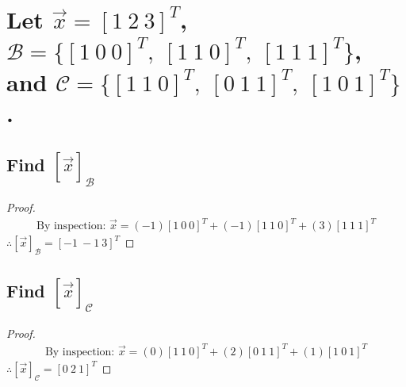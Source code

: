 \documentclass[../main.tex]{subfiles}
\begin{document}
\section{Let $\vec{x} = [1 \ 2 \ 3]^T$, $\mathcal{B} = \{[1 \ 0 \ 0]^T, \  [1 \ 1 \ 0]^T, \ [1 \ 1 \ 1]^T \}$, and $\mathcal{C} = \{[1 \ 1 \ 0]^T, \  [0 \ 1 \ 1]^T, \ [1 \ 0 \ 1]^T \}$.}
\subsection{Find $[\vec{x}]_{\mathcal{B}}$}
        \begin{proof}
                \begin{align*}
                        \textrm{By inspection: }  \vec{x} = (-1)[1 \ 0 \ 0]^T + (-1)[1 \ 1 \ 0]^T + (3)[1 \ 1 \ 1]^T
                \end{align*}
                $\therefore [\vec{x}]_{\mathcal{B}} =  [-1 \ -1 \ 3]^T $
        \end{proof}
        \subsection{Find $[\vec{x}]_{\mathcal{C}}$}
\begin{proof}
        \begin{align*}
                \textrm{By inspection: }\vec{x} =(0)[1 \ 1 \ 0]^T + (2)[0 \ 1 \ 1]^T + (1)[1 \ 0 \ 1]^T
        \end{align*}
        $\therefore [\vec{x}]_{\mathcal{C}} = [0 \ 2 \ 1]^T$
\end{proof}
\end{document}
